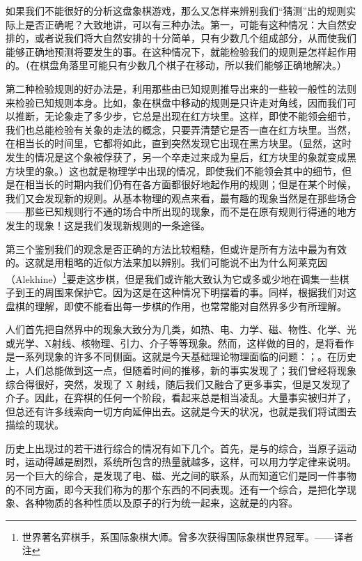 \documentclass[12pt,oneside]{book}
\begin{document}
如果我们不能很好的分析这盘象棋游戏，那么又怎样来辨别我们“猜测”出的规则实际上是否正确呢？大致地讲，可以有三种办法。第一，可能有这种情况：大自然安排的，或者说我们将大自然安排的十分简单，只有少数几个组成部分，从而使我们能够正确地预测将要发生的事。在这种情况下，就能检验我们的规则是怎样起作用的。（在棋盘角落里可能只有少数几个棋子在移动，所以我们能够正确地解决。）

第二种检验规则的好办法是，利用那些由已知规则推导出来的一些较一般性的法则来检验已知规则本身。比如，象在棋盘中移动的规则是只许走对角线，因而我们可以推断，无论象走了多少步，它总是出现在红方块里。这样，即使不能领会细节，我们也总能检验有关象的走法的概念，只要弄清楚它是否一直在红方块里。当然，在相当长的时间里，它都将如此，直到突然发现它出现在黑方块里。（显然，这时发生的情况是这个象被俘获了，另一个卒走过来成为皇后，红方块里的象就变成黑方块里的象。）这也就是物理学中出现的情况，即使我们不能领会其中的细节，但是在相当长的时期内我们仍有在各方面都很好地起作用的规则；但是在某个时候，我们又会发现新的规则。从基本物理的观点来看，最有趣的现象当然是在那些场合——那些已知规则行不通的场合中所出现的现象，而不是在原有规则行得通的地方发生的现象！这是我们发现新规则的一条途径。

第三个鉴别我们的观念是否正确的方法比较粗糙，但或许是所有方法中最为有效的。这就是用粗略的近似方法来加以辨别。我们可能说不出为什么阿莱克因（Alekhine）\footnote{世界著名弈棋手，系国际象棋大师。曾多次获得国际象棋世界冠军。——译者注}要走这步棋，但是我们或许能大致认为它或多或少地在调集一些棋子到王的周围来保护它。因为这是在这种情况下明摆着的事。同样，根据我们对这盘棋的理解，即使不能看出每一步棋的作用，也常常能对自然界多少有所理解。

人们首先把自然界中的现象大致分为几类，如热、电、力学、磁、物性、化学、光或光学、X射线、核物理、引力、介子等等现象。然而，这样做的目的，是将看作是一系列现象的许多不同侧面。这就是今天基础理论物理面临的问题：；。在历史上，人们总能做到这一点，但随着时间的推移，新的事实发现了；我们曾经将现象综合得很好，突然，发现了 X 射线，随后我们又融合了更多事实，但是又发现了介子。因此，在弈棋的任何一个阶段，看起来总是相当凌乱。大量事实被归并了，但总还有许多线索向一切方向延伸出去。这就是今天的状况，也就是我们将试图去描绘的现状。

历史上出现过的若干进行综合的情况有如下几个。首先，是与的综合，当原子运动时，运动得越是剧烈，系统所包含的热量就越多，这样，可以用力学定律来说明。另一个巨大的综合，是发现了电、磁、光之间的联系，从而知道它们是同一件事物的不同方面，即今天我们称为的那个东西的不同表现。还有一个综合，是把化学现象、各种物质的各种性质以及原子的行为统一起来，这就是的内容。
\end{document}
